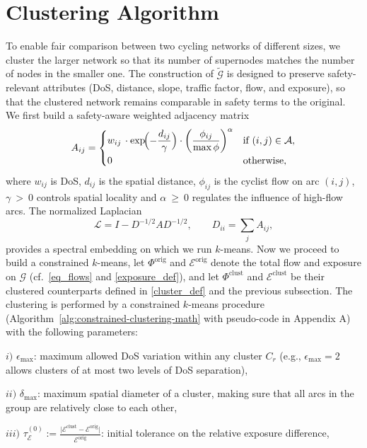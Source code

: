 \documentclass[lettersize,journal]{IEEEtran}
\begin{document}
\section{Clustering Algorithm}

To enable fair comparison between two cycling networks of different sizes, we cluster the larger network so that its number of supernodes matches the number of nodes in the smaller one. The construction of $\tilde{\mathcal{G}}$ is designed to preserve safety-relevant attributes (DoS, distance, slope, traffic factor, flow, and exposure), so that the clustered network remains comparable in safety terms to the original. We first build a safety-aware weighted adjacency matrix
\begin{equation}
\label{eq:adjacency_matrix}
A_{ij} =
\begin{cases}
w_{ij}\,\cdot \exp\!\Bigl(-\dfrac{d_{ij}}{\gamma}\Bigr) \cdot
\left(\dfrac{\phi_{ij}}{\max \phi}\right)^{\alpha} & \text{if } (i,j)\in\mathcal{A},\\[0.6em]
0 & \text{otherwise},
\end{cases}
\end{equation}
where $w_{ij}$ is DoS, $d_{ij}$ is the spatial distance, $\phi_{ij}$ is the cyclist flow on arc $(i,j)$, $\gamma~>~0$ controls spatial locality and $\alpha~\geq~0$ regulates the influence of high-flow arcs. The normalized Laplacian
\[
  \mathcal{L} = I - D^{-1/2} A D^{-1/2},
  \qquad D_{ii} = \sum_j A_{ij},
\]
provides a spectral embedding on which we run $k$-means. Now we proceed to build a constrained $k$-means, let $\Phi^{\mathrm{orig}}$ and $\mathcal{E}^{\mathrm{orig}}$ denote the total flow and exposure on $\mathcal{G}$ (cf.~\eqref{eq_flows} and \eqref{exposure_def}), and let $\Phi^{\mathrm{clust}}$ and $\mathcal{E}^{\mathrm{clust}}$ be their clustered counterparts defined in \eqref{cluster_def} and the previous subsection. The clustering is performed by a constrained $k$-means procedure (Algorithm~\ref{alg:constrained-clustering-math} with pseudo-code in Appendix A) with the following parameters:

\textit{$i)$} $\epsilon_{\max}$: maximum allowed DoS variation within any cluster $C_r$ (e.g., $\epsilon_{\max}=2$ allows clusters of at most two levels of DoS separation),

\textit{$ii)$}  $\delta_{\max}$: maximum spatial diameter of a cluster, making sure that all arcs in the group are relatively close to each other,

\textit{$iii)$} $\tau_{\mathcal{E}}^{(0)} :=\frac{\bigl|\mathcal{E}^{\mathrm{clust}} - \mathcal{E}^{\mathrm{orig}}\bigr|}{\mathcal{E}^{\mathrm{orig}}}$: initial tolerance on the relative exposure difference,
        
\end{document}
